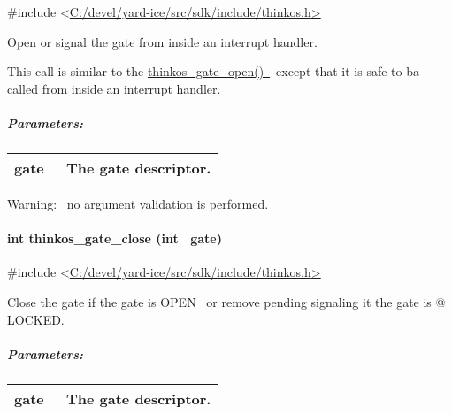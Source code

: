 {{}

{\#include
\textless{}}{\protect\hyperlink{h.pkwqa1}{C:/devel/yard-ice/src/sdk/include/thinkos.h}}{\protect\hyperlink{h.pkwqa1}{\textgreater{}}}

{Open or signal the gate from inside an interrupt handler. }

{This call is similar to the
}{\protect\hyperlink{h.3cqmetx}{thinkos\_gate\_open()}}{\protect\hyperlink{h.3cqmetx}{~}}{~except
that it is safe to ba called from inside an interrupt handler.}

\subparagraph{\texorpdfstring{{Parameters:}}{Parameters:}}\label{parameters-45}

\protect\hypertarget{t.5f99e327007a50c0bedc6d95e651021a3e43c836}{}{}\protect\hypertarget{t.45}{}{}

\begin{longtable}[]{@{}ll@{}}
\toprule
\begin{minipage}[t]{0.47\columnwidth}\raggedright\strut
{gate}{~}\strut
\end{minipage} & \begin{minipage}[t]{0.47\columnwidth}\raggedright\strut
{The gate descriptor.}\strut
\end{minipage}\tabularnewline
\bottomrule
\end{longtable}

{Warning:}{~ no argument validation is performed. }

\paragraph{\texorpdfstring{{int thinkos\_gate\_close (int
~gate)}}{int thinkos\_gate\_close (int ~gate)}}\label{int-thinkos_gate_close-int-gate}

{}

{\#include
\textless{}}{\protect\hyperlink{h.pkwqa1}{C:/devel/yard-ice/src/sdk/include/thinkos.h}}{\protect\hyperlink{h.pkwqa1}{\textgreater{}}}

{Close the gate if the gate is }{OPEN}{~ or remove pending signaling it
the gate is @ LOCKED. }

{}

\subparagraph{\texorpdfstring{{Parameters:}}{Parameters:}}\label{parameters-46}

\protect\hypertarget{t.63aac5addc95ec2809d3272ba50ab5f93508edb0}{}{}\protect\hypertarget{t.46}{}{}

\begin{longtable}[]{@{}ll@{}}
\toprule
\begin{minipage}[t]{0.47\columnwidth}\raggedright\strut
{gate}{~}\strut
\end{minipage} & \begin{minipage}[t]{0.47\columnwidth}\raggedright\strut
{The gate descriptor. }\strut
\end{minipage}\tabularnewline
\bottomrule
\end{longtable}

}
